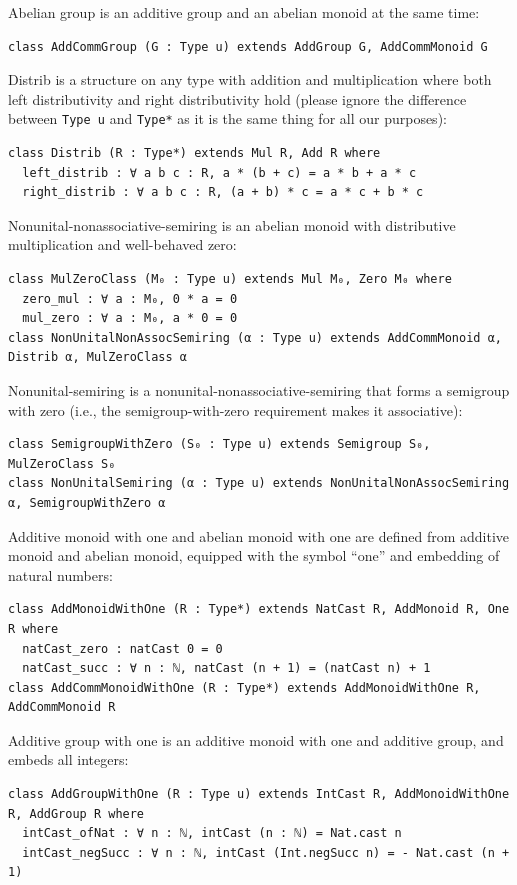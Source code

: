 \documentclass[]{article}
\renewcommand{\.}{\hskip .75pt}
\begin{document}
Abelian group is an additive group and an abelian monoid at the same time:
\begin{lstlisting}
class AddCommGroup (G : Type u) extends AddGroup G, AddCommMonoid G
\end{lstlisting}
Distrib is a structure on any type with addition and multiplication where
both left distributivity and right distributivity hold
(please ignore the difference between \texttt{Type u} and \texttt{Type*} as it is the same thing
for all our purposes):
\begin{lstlisting}
class Distrib (R : Type*) extends Mul R, Add R where
  left_distrib : ∀ a b c : R, a * (b + c) = a * b + a * c
  right_distrib : ∀ a b c : R, (a + b) * c = a * c + b * c
\end{lstlisting}
Nonunital-nonassociative-semiring is an abelian monoid with distributive multiplication and well-behaved zero:
\begin{lstlisting}
class MulZeroClass (M₀ : Type u) extends Mul M₀, Zero M₀ where
  zero_mul : ∀ a : M₀, 0 * a = 0
  mul_zero : ∀ a : M₀, a * 0 = 0
class NonUnitalNonAssocSemiring (α : Type u) extends AddCommMonoid α, Distrib α, MulZeroClass α
\end{lstlisting}
Nonunital-semiring is a nonunital-nonassociative-semiring that forms a semigroup with zero (i.e., the
semigroup-with-zero requirement makes it associative):
\begin{lstlisting}
class SemigroupWithZero (S₀ : Type u) extends Semigroup S₀, MulZeroClass S₀
class NonUnitalSemiring (α : Type u) extends NonUnitalNonAssocSemiring α, SemigroupWithZero α
\end{lstlisting}
Additive monoid with one and abelian monoid with one are defined from additive monoid
and abelian monoid, equipped with the symbol ``one'' and embedding of natural numbers:
\begin{lstlisting}
class AddMonoidWithOne (R : Type*) extends NatCast R, AddMonoid R, One R where
  natCast_zero : natCast 0 = 0
  natCast_succ : ∀ n : ℕ, natCast (n + 1) = (natCast n) + 1 
class AddCommMonoidWithOne (R : Type*) extends AddMonoidWithOne R, AddCommMonoid R
\end{lstlisting}
Additive group with one is an additive monoid with one and additive group, and embeds all integers:
\begin{lstlisting}
class AddGroupWithOne (R : Type u) extends IntCast R, AddMonoidWithOne R, AddGroup R where
  intCast_ofNat : ∀ n : ℕ, intCast (n : ℕ) = Nat.cast n 
  intCast_negSucc : ∀ n : ℕ, intCast (Int.negSucc n) = - Nat.cast (n + 1) 
\end{lstlisting}
\end{document}
